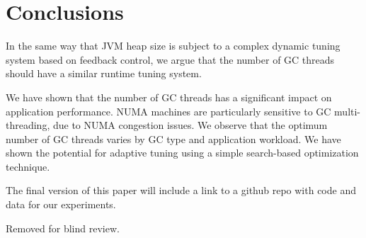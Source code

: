 \section{Conclusions}
\label{sec:concl}

In the same way that JVM heap size is subject to a 
complex dynamic tuning system based on 
feedback control, we argue that the number of GC threads should 
have a similar runtime tuning system.

We have shown that the number of GC threads has a significant impact on
application performance. NUMA machines are particularly sensitive to GC 
multi-threading, due to NUMA congestion issues.
We observe that the optimum number of GC threads varies by GC type and
application workload.
We have shown the potential for adaptive tuning using a simple search-based
optimization technique.

The final version of this paper will include a link to a github repo with
code and data for our experiments.

\acks

Removed for blind review.

